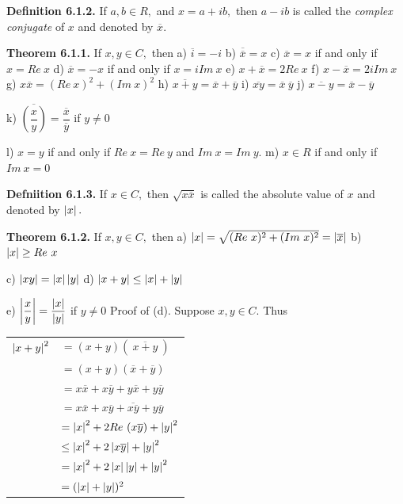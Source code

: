 \textbf{Definition 6.1.2.} If $a,b\in R,$ and $x = a + ib,$ then $a - ib$ is called the \textit{complex conjugate} of $x$ and denoted by $\overline x.$\nl

\textbf{Theorem 6.1.1.} If $x,y\in C,$ then \nl
a) $\overline{i}= -i $\nl
b) $\overline{\overline{x}} = x $\nl
c) $\overline{x} = x$ if and only if $x =Re~x $\nl
d) $\overline{x}= -x$ if and only if $x =iIm~x $\nl
e) $x + \overline{x} = 2Re~x$\nl
f) $x - \overline{x}= 2iIm~x$\nl
g) $x\overline{x}=(Re~x)^{2} + (Im~x)^{2}$\nl
h) $\overline{x + y} = \overline{x} + \overline{y}$\nl
i) $\overline{xy} = \overline{x}~\overline{y} $\nl
j) $\overline{x - y} = \overline{x} - \overline{y}$\nl

k) $\overline{\left(\dfrac{x}{y}\right)}  = \dfrac{\overline{x}}{\overline{y}}$ if $y \neq 0$\nl

l) $x = y$ if and only if $Re~x=Re~y$ and $Im~x =Im~y.$\nl
m) $x\in R$ if and only if $Im~x = 0$\nl

\textbf{Defniition 6.1.3.} If $x\in C,$ then $\sqrt{x\overline{x}}$ is called the absolute value of $x$ and denoted by $\left|x\right|.$ \nl

\textbf{Theorem 6.1.2.} If $x,y\in C,$ then\nl
a) $\left|x\right| = \sqrt{(Re~x)^{2} + (Im~x)^{2}} = \left|\overline{x}\right|$\nl
b) $\left|x\right| \geq Re~x$\nl

\newpage

c) $\left|xy\right| = \left|x\right|\left|y\right|$\nl
d) $\left|x + y\right| \leq \left|x\right| + \left|y\right|$\nl

e) $\left|\dfrac{x}{y}\right| = \dfrac{\left|x\right|}{\left|y\right|}$ if $y \neq 0$\nl
Proof of (d).  Suppose $x,y\in C.$  Thus\nl
\begin{tabular}{r l}
$\left|x + y\right|^{2}$&$= (x + y)(~\overline{x + y}~)$\\
&$=(x + y)(\overline{x} + \overline{y})$\\
&$=x\overline{x} + x\overline{y} + y\overline{x} + y\overline{y}$\\
&$=x\overline{x} + x\overline{y} +\overline{x\overline{y}} +y\overline{y}$\\
&$=\left|x\right|^{2} + 2Re~(x\overline{y}) + \left|y\right|^{2}$\\
&$\leq \left|x\right|^{2} + 2\left|x\overline{y}\right| + \left|y\right|^{2}$\\
&$=\left|x\right|^{2} + 2\left|x\right|\left|y\right| + \left|y\right|^{2}$\\
&$=(\left|x\right| + \left|y\right|)^{2}$\\
\end{tabular}\\

